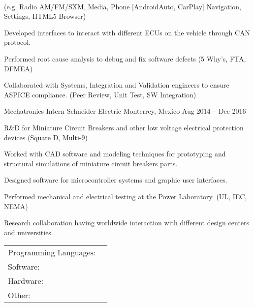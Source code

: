 \documentclass[]{awesome-cv}
\begin{document}
\begin{cventries}
{\begin{cvitems}
{			\\ (e.g. Radio AM/FM/SXM, Media, Phone [AndroidAuto, CarPlay] Navigation, Settings, HTML5 Browser)}
		\item {Developed interfaces to interact with different ECUs on the vehicle through CAN protocol.}
		\item {Performed root cause analysis to debug and fix software defects (5 Why’s, FTA, DFMEA)}
		\item {Collaborated with Systems, Integration and Validation engineers to ensure ASPICE compliance. (Peer Review, Unit Test, 
		SW Integration)}
		\end{cvitems}}
	\cventry
	{Mechatronics Intern}
	{Schneider Electric}
	{Monterrey, Mexico}
	{Aug 2014 – Dec 2016}
	{\begin{cvitems}
		\item {R\&D for Miniature Circuit Breakers and other low voltage electrical protection devices (Square D, Multi-9)}
		\item {Worked with CAD software and modeling techniques for prototyping and structural simulations of miniature circuit 
		breakers parts.}
		\item {Designed software for microcontroller systems and graphic user interfaces.}
		\item {Performed mechanical and electrical testing at the Power Laboratory. (UL, IEC, NEMA)}
		\item {Research collaboration having worldwide interaction with different design centers and universities.}
		\end{cvitems}}
\end{cventries}

\vspace{-5mm}
\begin{cventries}
	\cventry
	{}
	{\def\arraystretch{1.15}{\begin{tabular}{ l l }
		Programming Languages:  & {\skill{\quad C/C++, Python}} \\
		Software:  & {\skill{\quad Linux, Git, Qt(QML), OpenCV, ROS}} \\
		Hardware:  & {\skill{\quad x86, ARM Cortex-A, Raspberry Pi, Arduino, NVIDIA Jetson}} \\
		Other:  & {\skill{\quad CAN, Ethernet, I2C, SPI, MQTT, Protobuf}} \\
		\end{tabular}}}
	{}
	{}
	{}
\end{cventries}
\end{document}
